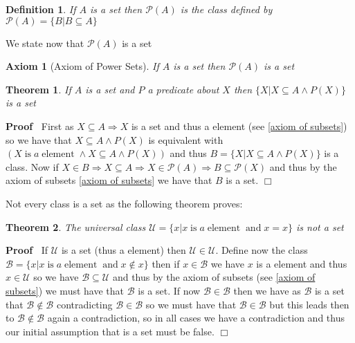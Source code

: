 \documentclass{book}
\newcommand{\nin}{\not\in}
\newcommand{\nobracket}{}
\newcommand{\tmop}[1]{\ensuremath{\operatorname{#1}}}
\newcommand{\tmverbatim}[1]{{\ttfamily{#1}}}
\newenvironment{proof}{\noindent\textbf{Proof\ }}{\hspace*{\fill}$\Box$\medskip}
\newtheorem{axiom}{Axiom}
\newtheorem{definition}{Definition}
{\theorembodyfont{\rmfamily}\newtheorem{example}{Example}}
\newtheorem{theorem}{Theorem}
\begin{document}
{{\begin{definition}
  If $A$ is a set then $\mathcal{P} (A)$ is the class defined by $\mathcal{P}
  (A) = \{ B | B \subseteq A \nobracket \}$
\end{definition}

We state now that $\mathcal{P} (A)$ is a set

\begin{axiom}[Axiom of Power Sets]
  \label{axiom of power sets}{}{}If $A$ is a set then $\mathcal{P} (A)$ is a set
\end{axiom}

\begin{theorem}
  If $A$ is a set and $P$ a predicate about $X$ then $\{ X | X \subseteq A
  \wedge P (X) \nobracket \}$ is a set
\end{theorem}

\begin{proof}
  First as $X \subseteq A \Rightarrow X$ is a set and thus a element (see
  \ref{axiom of subsets}) so we have that $X \subseteq A \wedge P (X)$ is
  equivalent with $(X \tmop{is} a \tmop{element} \wedge X \subseteq A \wedge P
  (X))$ and thus $B = \{ X | X \subseteq A \wedge P (X) \nobracket \}$ is a
  class. Now if $X \in B \Rightarrow X \subseteq A \Rightarrow X \in
  \mathcal{P} (A) \Rightarrow B \subseteq \mathcal{P} (X)$ and thus by the
  axiom of subsets \ref{axiom of subsets} we have that $B$ is a set.
\end{proof}

Not every class is a set as the following theorem proves:

\begin{theorem}
  The universal class $\mathcal{U}= \{ x|x \tmop{is} a \tmop{element}
  \tmop{and} x = x \}$ is not a set
\end{theorem}

\begin{proof}
  If $\mathcal{U}$ is a set (thus a element) then $\mathcal{U} \in
  \mathcal{U}$. Define now the class $\mathcal{B}= \{ x|x \tmop{is} a
  \tmop{element} \tmop{and} x \nin x \}$ then if $x \in \mathcal{B}$ we have
  $x$ is a element and thus $x \in \mathcal{U}$ so we have $\mathcal{B}
  \subseteq \mathcal{U}$ and thus by the axiom of subsets (see \ref{axiom of
  subsets}) we must have that $\mathcal{B}$ is a set. If now $\mathcal{B} \in
  \mathcal{B}$ then we have as $\mathcal{B}$ is a set that $\mathcal{B} \nin
  \mathcal{B}$ contradicting $\mathcal{B} \in \mathcal{B}$ so we must have
  that $\mathcal{B} \in \mathcal{B}$ but this leads then to $\mathcal{B} \nin
  \mathcal{B}$ again a contradiction, so in all cases we have a contradiction
  and thus our initial assumption that \tmverbatim{$\mathcal{U}$} is a set
  must be false.
\end{proof}

}}
\end{document}
